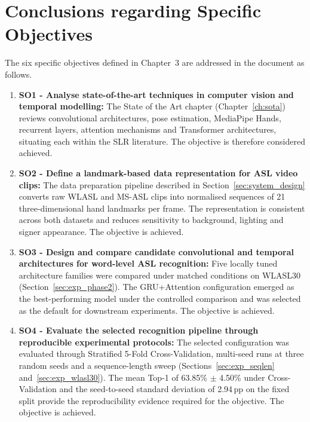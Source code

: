 \section{Conclusions regarding Specific Objectives}

The six specific objectives defined in Chapter~3 are addressed in the document as follows.

\begin{enumerate}
    \item \textbf{SO1 - Analyse state-of-the-art techniques in computer vision and temporal modelling:}
          The State of the Art chapter (Chapter~\ref{ch:sota}) reviews convolutional architectures,
          pose estimation, MediaPipe Hands, recurrent layers, attention mechanisms and Transformer
          architectures, situating each within the SLR literature. The objective is therefore considered
          achieved.

    \item \textbf{SO2 - Define a landmark-based data representation for ASL video clips:}
          The data preparation pipeline described in Section~\ref{sec:system_design} converts raw WLASL and MS-ASL clips into
          normalised sequences of 21 three-dimensional hand landmarks per frame. The representation is
          consistent across both datasets and reduces sensitivity to background, lighting and signer
          appearance. The objective is achieved.

    \item \textbf{SO3 - Design and compare candidate convolutional and temporal architectures for
              word-level ASL recognition:} Five locally tuned architecture families were compared under
          matched conditions on WLASL30 (Section~\ref{sec:exp_phase2}). The GRU+Attention configuration
          emerged as the best-performing model under the controlled comparison and was selected as the
          default for downstream experiments. The objective is achieved.

    \item \textbf{SO4 - Evaluate the selected recognition pipeline through reproducible experimental
              protocols:} The selected configuration was evaluated through Stratified 5-Fold
          Cross-Validation, multi-seed runs at three random seeds and a sequence-length sweep
          (Sections~\ref{sec:exp_seqlen} and~\ref{sec:exp_wlasl30}). The mean Top-1 of 63.85\% $\pm$
          4.50\% under Cross-Validation and the seed-to-seed standard deviation of 2.94\,pp on the fixed
          split provide the reproducibility evidence required for the objective. The objective is
          achieved.


\end{enumerate}

